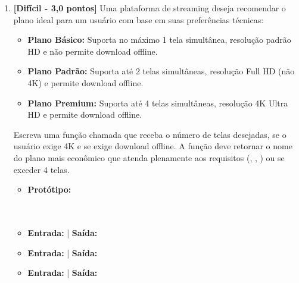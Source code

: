 \begin{enumerate}[label=\textbf{Q\arabic*.}, start=11]
\begin{itemize}[leftmargin=*]
    \item \textbf{Protótipo:}\newline {}\\\\\\
    \item \textbf{Entrada:}  | \textbf{Saída:} 
    \item \textbf{Entrada:}  | \textbf{Saída:} 
\end{itemize}



\vspace{0.4cm}

\item \textbf{[Difícil - 3,0 pontos]} Uma plataforma de streaming deseja recomendar o plano ideal para um usuário com base em suas preferências técnicas:
\begin{itemize}
    \item \textbf{Plano Básico:} Suporta no máximo 1 tela simultânea, resolução padrão HD e não permite download offline.
    \item \textbf{Plano Padrão:} Suporta até 2 telas simultâneas, resolução Full HD (não 4K) e permite download offline.
    \item \textbf{Plano Premium:} Suporta até 4 telas simultâneas, resolução 4K Ultra HD e permite download offline.
\end{itemize}
Escreva uma função chamada  que receba o número de telas desejadas, se o usuário exige 4K e se exige download offline. A função deve retornar o nome do plano mais econômico que atenda plenamente aos requisitos (, , ) ou  se exceder 4 telas.

\begin{itemize}[leftmargin=*]
    \item \textbf{Protótipo:}\newline {}\\\\\\
    \item \textbf{Entrada:}  | \textbf{Saída:} 
    \item \textbf{Entrada:}  | \textbf{Saída:} 
    \item \textbf{Entrada:}  | \textbf{Saída:} 
\end{itemize}


\end{enumerate}
